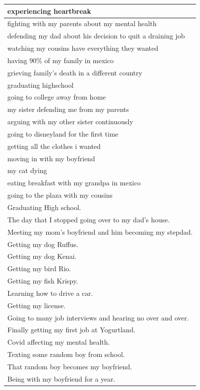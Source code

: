 \documentclass[
  .7em,
  letterpaper,
  DIV=11,
  numbers=noendperiod]{scrartcl}
\begin{document}
\begin{table}
\begin{tabular}{l}
\hline
experiencing heartbreak\\
\hline
fighting with my parents about my mental health\\
\hline
defending my dad about his decision to quit a draining job\\
\hline
watching my cousins have everything they wanted\\
\hline
having 90\% of my family in mexico\\
\hline
grieving family's death in a different country\\
\hline
graduating highschool\\
\hline
going to college away from home\\
\hline
my sister defending me from my parents\\
\hline
arguing with my other sister continuously\\
\hline
going to disneyland for the first time\\
\hline
getting all the clothes i wanted\\
\hline
moving in with my boyfriend\\
\hline
my cat dying\\
\hline
eating breakfast with my grandpa in mexico\\
\hline
going to the plaza with my cousins\\
\hline
Graduating High school.\\
\hline
The day that I stopped going over to my dad's house.\\
\hline
Meeting my mom's boyfriend and him becoming my stepdad.\\
\hline
Getting my dog Ruffus.\\
\hline
Getting my dog Kenai.\\
\hline
Getting my bird Rio.\\
\hline
Getting my fish Krispy.\\
\hline
Learning how to drive a car.\\
\hline
Getting my license.\\
\hline
Going to many job interviews and hearing no over and over.\\
\hline
Finally getting my first job at Yogurtland.\\
\hline
Covid affecting my mental health.\\
\hline
Texting some random boy from school.\\
\hline
That random boy becomes my boyfriend.\\
\hline
Being with my boyfriend for a year.\\

\end{tabular}
\end{table}
\end{document}
